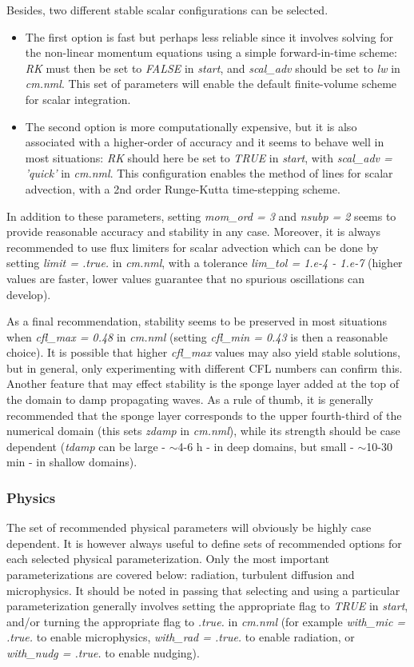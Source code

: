 \documentclass[12pt,A4,french]{article}
\begin{document}
Besides, two different stable scalar configurations can be selected. 
\begin{itemize}
\item The first option is fast but perhaps less reliable since it involves solving for the non-linear momentum equations using a simple forward-in-time scheme: {\it RK} must then be set to {\it FALSE} in {\it start}, and {\it scal\_adv} should be set to {\it lw} in {\it cm.nml}. This set of parameters will enable the default finite-volume scheme for scalar integration. 
\item The second option is more computationally expensive, but it is also associated with a higher-order of accuracy and it seems to behave well in most situations: {\it RK} should here be set to {\it TRUE} in {\it start}, with {\it scal\_adv = 'quick'} in {\it cm.nml}. This configuration enables the method of lines for scalar advection, with a 2nd order Runge-Kutta time-stepping scheme.
\end{itemize}

In addition to these parameters, setting {\it mom\_ord = 3} and {\it nsubp = 2} seems to provide reasonable accuracy and stability in any case. Moreover, it is always recommended to use flux limiters for scalar advection which can be done by setting {\it limit = .true.} in {\it cm.nml}, with a tolerance {\it lim\_tol = 1.e-4 - 1.e-7} (higher values are faster, lower values guarantee that no spurious oscillations can develop).

As a final recommendation, stability seems to be preserved in most situations when {\it cfl\_max = 0.48} in {\it cm.nml} (setting {\it cfl\_min = 0.43} is then a reasonable choice). It is possible that higher {\it cfl\_max} values may also yield stable solutions, but in general, only experimenting with different CFL numbers can confirm this. Another feature that may effect stability is the sponge layer added at the top of the domain to damp propagating waves. As a rule of thumb, it is generally recommended that the sponge layer corresponds to the upper fourth-third of the numerical domain (this sets {\it zdamp} in {\it cm.nml}), while its strength should be case dependent ({\it tdamp} can be large - $\sim$4-6 h - in deep domains, but small - $\sim$10-30 min - in shallow domains).

\subsubsection{Physics}

The set of recommended physical parameters will obviously be highly case dependent. It is however always useful to define sets of recommended options for each selected physical parameterization. Only the most important parameterizations are covered below: radiation, turbulent diffusion and microphysics. It should be noted in passing that selecting and using a particular parameterization generally involves setting the appropriate flag to {\it TRUE} in {\it start}, and/or turning the appropriate flag to {\it .true.} in {\it cm.nml} (for example {\it with\_mic = .true.} to enable microphysics, {\it with\_rad = .true.} to enable radiation, or {\it with\_nudg = .true.} to enable nudging).
\end{document}
